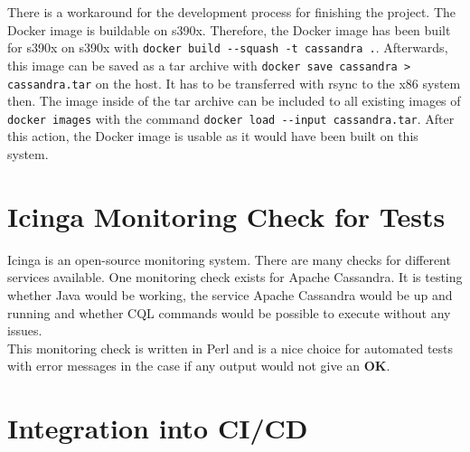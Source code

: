 There is a workaround for the development process for finishing the project. The Docker image is buildable on s390x. Therefore, the Docker image has been built for s390x on s390x with  \lstinline!docker build --squash -t cassandra .!.
Afterwards, this image can be saved as a tar archive with \lstinline!docker save cassandra > cassandra.tar! on the host. It has to be transferred with rsync to the x86 system then. The image inside of the tar archive can be included to all existing images of \lstinline!docker images! with the command \lstinline!docker load --input cassandra.tar!. After this action, the Docker image is usable as it would have been built on this system. 

\section{Icinga Monitoring Check for Tests}

Icinga is an open-source monitoring system. There are many checks for different services available. One monitoring check exists for Apache Cassandra. It is testing whether Java would be working, the service Apache Cassandra would be up and running and whether CQL commands would be possible to execute without any issues. \\
This monitoring check is written in Perl and is a nice choice for automated tests with error messages in the case if any output would not give an \textbf{OK}. 

\section{Integration into CI/CD}